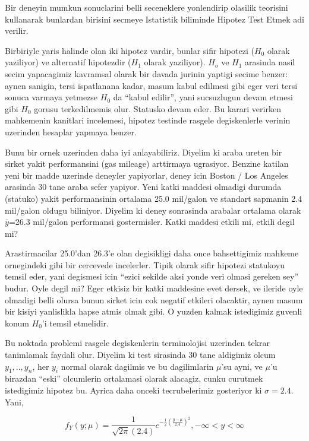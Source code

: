 \documentclass[12pt,fleqn]{article}\usepackage{../common}
\begin{document}
Bir deneyin mumkun sonuclarini belli seceneklere yonlendirip olasilik
teorisini kullanarak bunlardan birisini secmeye Istatistik biliminde
Hipotez Test Etmek adi verilir.  

Birbiriyle yaris halinde olan iki hipotez vardir, bunlar sifir hipotezi
($H_0$ olarak yaziliyor) ve alternatif hipotezdir ($H_1$ olarak
yaziliyor). $H_o$ ve $H_1$ arasinda nasil secim yapacagimiz kavramsal
olarak bir davada jurinin yaptigi secime benzer: aynen sanigin, tersi
ispatlanana kadar, masum kabul edilmesi gibi eger veri tersi sonuca varmaya
yetmezse $H_0$ da ``kabul edilir'', yani sucsuzlugun devam etmesi gibi
$H_0$ gorusu terkedilmemis olur. Statusko devam eder. Bu karari verirken
mahkemenin kanitlari incelemesi, hipotez testinde rasgele degiskenlerle
verinin uzerinden hesaplar yapmaya benzer.

Bunu bir ornek uzerinden daha iyi anlayabiliriz. Diyelim ki araba ureten
bir sirket yakit performansini (gas mileage) arttirmaya ugrasiyor. Benzine
katilan yeni bir madde uzerinde deneyler yapiyorlar, deney icin Boston /
Los Angeles arasinda 30 tane araba sefer yapiyor. Yeni katki maddesi
olmadigi durumda (statuko) yakit performansinin ortalama 25.0 mil/galon ve
standart sapmanin 2.4 mil/galon oldugu biliniyor. Diyelim ki deney
sonrasinda arabalar ortalama olarak $\bar{y}$=26.3 mil/galon performansi
gostermisler. Katki maddesi etkili mi, etkili degil mi?

Arastirmacilar 25.0'dan 26.3'e olan degisikligi daha once bahsettigimiz
mahkeme ornegindeki gibi bir cercevede incelerler. Tipik olarak sifir
hipotezi statukoyu temsil eder, yani degismesi icin ``ezici sekilde aksi
yonde veri olmasi gereken sey'' budur. Oyle degil mi? Eger etkisiz bir
katki maddesine evet dersek, ve ileride oyle olmadigi belli olursa bunun
sirket icin cok negatif etkileri olacaktir, aynen masum bir kisiyi
yanlislikla hapse atmis olmak gibi. O yuzden kalmak istedigimiz guvenli
konum $H_0$'i temsil etmelidir. 

Bu noktada problemi rasgele degiskenlerin terminolojisi uzerinden tekrar
tanimlamak faydali olur. Diyelim ki test sirasinda 30 tane aldigimiz olcum
$y_1,..,y_n$, her $y_i$ normal olarak dagilmis ve bu dagilimlarin $\mu$'su
ayni, ve $\mu$'u birazdan ``eski'' olcumlerin ortalamasi olarak alacagiz,
cunku curutmek istedigimiz hipotez bu. Ayrica daha onceki tecrubelerimiz
gosteriyor ki $\sigma = 2.4$. Yani,

$$ 
f_Y(y;\mu) = \frac{1}{\sqrt{2\pi}(2.4)} 
e^{-\frac{1}{2}(\frac{y-\mu}{2.4})^2},
-\infty < y < \infty
$$
\end{document}

